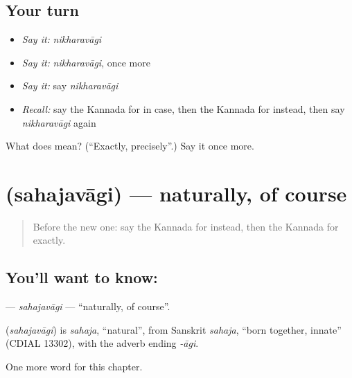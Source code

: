 \subsection*{Your turn}
\begin{itemize}
\raggedright
  \item \emph{Say it:} \emph{nikharavāgi}
  \item \emph{Say it:} \emph{nikharavāgi}, once more
  \item \emph{Say it:} say \emph{nikharavāgi}
  \item \emph{Recall:} say the Kannada for in case, then the Kannada for instead, then say \emph{nikharavāgi} again
\end{itemize}

\begin{tcolorbox}[breakable,colback=teal!4,colframe=teal!35!black,title={Before you move on}]
What does  mean? (\textquotedblleft{}Exactly, precisely\textquotedblright{}.) Say it once more.
\end{tcolorbox}
\section[\texorpdfstring{\kn{ಸಹಜವಾಗಿ} (sahajavāgi)}{ಸಹಜವಾಗಿ (sahajavāgi)}]{ (sahajavāgi) — naturally, of course}

\label{lesson:KA-C177-sahajavagi}



\begin{quote}
Before the new one: say the Kannada for instead, then the Kannada for exactly.
\end{quote}

\subsection*{You'll want to know: }
\textbf{} — \emph{sahajavāgi} — \textquotedblleft{}naturally, of course\textquotedblright{}.

\begin{cousinweb}
\textbf{} (\emph{sahajavāgi}) is \emph{sahaja}, \textquotedblleft{}natural\textquotedblright{}, from Sanskrit \emph{sahaja}, \textquotedblleft{}born together, innate\textquotedblright{} (CDIAL 13302), with the adverb ending \emph{-āgi}.
\end{cousinweb}

\begin{grammarlens}[title={What you've built}]
One more word for this chapter.
\end{grammarlens}

